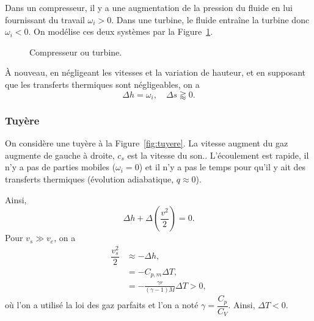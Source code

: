             Dans un compresseur, il y a une augmentation de la pression du fluide en lui fournissant du travail $\omega_i>0$. Dans une turbine, le fluide entraîne la turbine donc $\omega_i<0$. On modélise ces deux systèmes par la Figure~\ref{fig:compresseur_turbine}.

            \begin{figure}
                \centering
                \caption{Compresseur ou turbine.}    
                \label{fig:compresseur_turbine}
            \end{figure}

            À nouveau, en négligeant les vitesses et la variation de hauteur, et en supposant que les transferts thermiques sont négligeables, on a 
            \begin{equation}
                \boxed{
                    \Delta h=\omega_i,\quad \Delta s\gtrapprox0.
                }
            \end{equation}

        \subsubsection{Tuyère}
            On considère une tuyère à la Figure~\ref{fig:tuyere}. La vitesse augment du gaz augmente de gauche à droite, $c_s$ est la vitesse du son.. L'écoulement est rapide, il n'y a pas de parties mobiles ($\omega_i=0$) et il n'y a pas le temps pour qu'il y ait des transferts thermiques (évolution adiabatique, $q\approx0$).

            Ainsi,
            \begin{equation}
                \Delta h+\Delta\left(\frac{v^{2}}{2}\right)=0.
            \end{equation}
            Pour $v_s\gg v_e$, on a
            \begin{align}
                \dfrac{v_s^{2}}{2}
                &\approx-\Delta h,\\
                &=-C_{p,m}\Delta T,\\
                &=-\frac{\gamma r}{\left(\gamma-1\right)M}\Delta T>0,
            \end{align}
            où l'on a utilisé la loi des gaz parfaits et l'on a noté $\gamma=\dfrac{C_p}{C_V}$. Ainsi, $\Delta T<0$.

